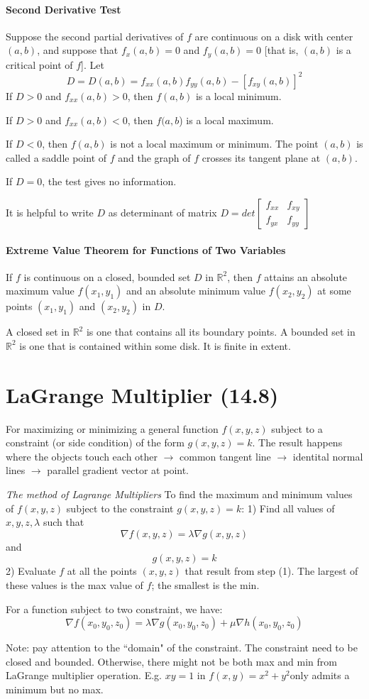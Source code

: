 \documentclass[11pt, oneside]{article}   	%
\begin{document}
\paragraph{Second Derivative Test} Suppose the second partial derivatives of $f$ are continuous on a disk with center $(a,b)$, and suppose that $f_x(a,b)=0$ and $f_y(a,b) = 0$ [that is, $(a,b)$ is a critical point of $f$]. Let $$ D = D(a,b) = f_{xx}(a,b)f_{yy}(a,b) -[f_{xy}(a,b)]^2$$
If $D > 0$ and $f_{xx}(a,b) > 0$, then $f(a,b)$ is a local minimum.
\par
If $D > 0$ and $ f_{xx}(a,b) < 0$, then $f(a,b$) is a local maximum.
\par
If $D < 0$, then $f(a,b)$ is not a local maximum or minimum. The point $(a,b)$ is called a saddle point of $f$ and the graph of $f$ crosses its tangent plane at $(a,b)$.
\par
If $D = 0$, the test gives no information.
\par
It is helpful to write $D$ as determinant of matrix $D = det \begin{bmatrix} f_{xx} & f_{xy}  \\ f_{yx} & f_{yy} \end{bmatrix}$
\paragraph{Extreme Value Theorem for Functions of Two Variables} If $f$ is continuous on a closed, bounded set $D$ in $\mathbb{R}^2$, then $f$ attains an absolute maximum value $f(x_1,y_1)$ and an absolute minimum value $f(x_2,y_2)$ at some points $(x_1,y_1)$ and $(x_2,y_2)$ in $D$.
\par
A closed set in $\mathbb{R}^2$ is one that contains all its boundary points. A bounded set in $\mathbb{R}^2$ is one that is contained within some disk. It is finite in extent.


\section{LaGrange Multiplier (14.8)}
For maximizing or minimizing a general function $f(x,y,z)$ subject to a constraint (or side condition) of the form $g(x,y,z) = k $. The result happens where the objects touch each other $\to$ common tangent line $\to$ identital normal lines $\to$ parallel gradient vector at point.
\par
\emph{The method of Lagrange Multipliers   } To find the maximum and minimum values of $f(x,y,z)$ subject to the constraint $g(x,y,z) = k$: 1) Find all values of $x,y,z,\lambda$ such that $$\nabla f(x,y,z) = \lambda \nabla g(x,y,z) $$ and $$g(x,y,z) = k$$ 2) Evaluate $f$ at all the points $(x,y,z)$ that result from step (1). The largest of these values is the max value of $f$; the smallest is the min.
\par
For a function subject to two constraint, we have: $$\nabla f(x_0, y_0, z_0) = \lambda \nabla g(x_0, y_0, z_0) + \mu \nabla h(x_0, y_0, z_0)$$
\par
Note: pay attention to the ``domain" of the constraint. The constraint need to be closed and bounded. Otherwise, there might not be both max and min from LaGrange multiplier operation. E.g. $xy=1$ in $f(x,y)=x^2 + y^2$only admits a minimum but no max.
\end{document}
